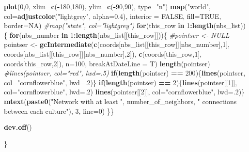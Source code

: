 \documentclass[]{book}
\newenvironment{Shaded}{\begin{snugshade}}{\end{snugshade}}
\newcommand{\KeywordTok}[1]{\textcolor[rgb]{0.13,0.29,0.53}{\textbf{{#1}}}}
\newcommand{\DataTypeTok}[1]{\textcolor[rgb]{0.13,0.29,0.53}{{#1}}}
\newcommand{\DecValTok}[1]{\textcolor[rgb]{0.00,0.00,0.81}{{#1}}}
\newcommand{\FloatTok}[1]{\textcolor[rgb]{0.00,0.00,0.81}{{#1}}}
\newcommand{\StringTok}[1]{\textcolor[rgb]{0.31,0.60,0.02}{{#1}}}
\newcommand{\CommentTok}[1]{\textcolor[rgb]{0.56,0.35,0.01}{\textit{{#1}}}}
\newcommand{\OtherTok}[1]{\textcolor[rgb]{0.56,0.35,0.01}{{#1}}}
\newcommand{\ControlFlowTok}[1]{\textcolor[rgb]{0.13,0.29,0.53}{\textbf{{#1}}}}
\newcommand{\OperatorTok}[1]{\textcolor[rgb]{0.81,0.36,0.00}{\textbf{{#1}}}}
\newcommand{\NormalTok}[1]{{#1}}
\theoremstyle{definition}
\theoremstyle{definition}
\theoremstyle{remark}
\begin{document}
\begin{Shaded}
\begin{Highlighting}[]
\KeywordTok{plot}\NormalTok{(}\DecValTok{0}\NormalTok{,}\DecValTok{0}\NormalTok{, }\DataTypeTok{xlim=}\KeywordTok{c}\NormalTok{(}\OperatorTok{-}\DecValTok{180}\NormalTok{,}\DecValTok{180}\NormalTok{), }\DataTypeTok{ylim=}\KeywordTok{c}\NormalTok{(}\OperatorTok{-}\DecValTok{90}\NormalTok{,}\DecValTok{90}\NormalTok{), }\DataTypeTok{type=}\StringTok{"n"}\NormalTok{)}
\KeywordTok{map}\NormalTok{(}\StringTok{"world"}\NormalTok{, }\DataTypeTok{col=}\KeywordTok{adjustcolor}\NormalTok{(}\StringTok{"lightgrey"}\NormalTok{, }\DataTypeTok{alpha=}\FloatTok{0.4}\NormalTok{), }\DataTypeTok{interior =} \OtherTok{FALSE}\NormalTok{, }\DataTypeTok{fill=}\OtherTok{TRUE}\NormalTok{, }\DataTypeTok{border=}\OtherTok{NA}\NormalTok{)}
\CommentTok{#map("state", col="lightgrey")}
\ControlFlowTok{for}\NormalTok{(this_row }\ControlFlowTok{in} \DecValTok{1}\OperatorTok{:}\KeywordTok{length}\NormalTok{(nbs_list))\{}
\ControlFlowTok{for}\NormalTok{(nbs_number }\ControlFlowTok{in} \DecValTok{1}\OperatorTok{:}\KeywordTok{length}\NormalTok{(nbs_list[[this_row]]))\{}
\CommentTok{#pointser <- NULL}
\NormalTok{pointser <-}\StringTok{ }\KeywordTok{gcIntermediate}\NormalTok{(}\KeywordTok{c}\NormalTok{(coords[nbs_list[[this_row]][nbs_number],}\DecValTok{1}\NormalTok{], coords[nbs_list[[this_row]][nbs_number],}\DecValTok{2}\NormalTok{]), }\KeywordTok{c}\NormalTok{(coords[this_row,}\DecValTok{1}\NormalTok{], coords[this_row,}\DecValTok{2}\NormalTok{]), }\DataTypeTok{n=}\DecValTok{100}\NormalTok{, }\DataTypeTok{breakAtDateLine =}\NormalTok{ T)}
    \KeywordTok{length}\NormalTok{(pointser)}
    \CommentTok{#lines(pointser, col="red", lwd=.5)}
\ControlFlowTok{if}\NormalTok{(}\KeywordTok{length}\NormalTok{(pointser) }\OperatorTok{==}\StringTok{ }\DecValTok{200}\NormalTok{)\{}\KeywordTok{lines}\NormalTok{(pointser, }\DataTypeTok{col=}\StringTok{"cornflowerblue"}\NormalTok{, }\DataTypeTok{lwd=}\NormalTok{.}\DecValTok{2}\NormalTok{)\}}
\ControlFlowTok{if}\NormalTok{(}\KeywordTok{length}\NormalTok{(pointser) }\OperatorTok{==}\StringTok{ }\DecValTok{2}\NormalTok{)\{}\KeywordTok{lines}\NormalTok{(pointser[[}\DecValTok{1}\NormalTok{]], }\DataTypeTok{col=}\StringTok{"cornflowerblue"}\NormalTok{, }\DataTypeTok{lwd=}\NormalTok{.}\DecValTok{2}\NormalTok{)}
    \KeywordTok{lines}\NormalTok{(pointser[[}\DecValTok{2}\NormalTok{]], }\DataTypeTok{col=}\StringTok{"cornflowerblue"}\NormalTok{, }\DataTypeTok{lwd=}\NormalTok{.}\DecValTok{2}\NormalTok{)\}}
    \KeywordTok{mtext}\NormalTok{(}\KeywordTok{paste0}\NormalTok{(}\StringTok{"Network with at least "}\NormalTok{, number_of_neighbors, }\StringTok{" connections between each culture"}\NormalTok{), }\DecValTok{3}\NormalTok{, }\DataTypeTok{line=}\DecValTok{0}\NormalTok{)}
\NormalTok{\}\}}

\KeywordTok{dev.off}\NormalTok{()}


\NormalTok{\}}
\end{Highlighting}
\end{Shaded}
\end{document}
